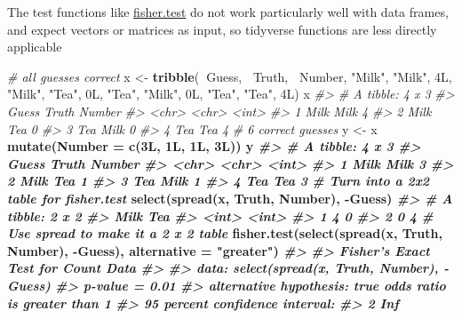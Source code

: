 \documentclass[]{book}
\newenvironment{Shaded}{\begin{snugshade}}{\end{snugshade}}
\newcommand{\KeywordTok}[1]{\textcolor[rgb]{0.13,0.29,0.53}{\textbf{#1}}}
\newcommand{\DataTypeTok}[1]{\textcolor[rgb]{0.13,0.29,0.53}{#1}}
\newcommand{\StringTok}[1]{\textcolor[rgb]{0.31,0.60,0.02}{#1}}
\newcommand{\CommentTok}[1]{\textcolor[rgb]{0.56,0.35,0.01}{\textit{#1}}}
\newcommand{\OperatorTok}[1]{\textcolor[rgb]{0.81,0.36,0.00}{\textbf{#1}}}
\newcommand{\NormalTok}[1]{#1}
\theoremstyle{definition}
\theoremstyle{definition}
\theoremstyle{definition}
\theoremstyle{remark}
\begin{document}
The test functions like
\href{https://www.rdocumentation.org/packages/stat/topics/fisher.test}{fisher.test}
do not work particularly well with data frames, and expect vectors or
matrices as input, so tidyverse functions are less directly applicable

\begin{Shaded}
\begin{Highlighting}[]
\CommentTok{# all guesses correct}
\NormalTok{x <-}\StringTok{ }\KeywordTok{tribble}\NormalTok{(}\OperatorTok{~}\NormalTok{Guess, }\OperatorTok{~}\NormalTok{Truth, }\OperatorTok{~}\NormalTok{Number,}
             \StringTok{"Milk"}\NormalTok{, }\StringTok{"Milk"}\NormalTok{, 4L,}
             \StringTok{"Milk"}\NormalTok{, }\StringTok{"Tea"}\NormalTok{, 0L,}
             \StringTok{"Tea"}\NormalTok{, }\StringTok{"Milk"}\NormalTok{, 0L,}
             \StringTok{"Tea"}\NormalTok{, }\StringTok{"Tea"}\NormalTok{, 4L)}
\NormalTok{x}
\CommentTok{#> # A tibble: 4 x 3}
\CommentTok{#>   Guess Truth Number}
\CommentTok{#>   <chr> <chr>  <int>}
\CommentTok{#> 1 Milk  Milk       4}
\CommentTok{#> 2 Milk  Tea        0}
\CommentTok{#> 3 Tea   Milk       0}
\CommentTok{#> 4 Tea   Tea        4}
\CommentTok{# 6 correct guesses}
\NormalTok{y <-}\StringTok{ }\NormalTok{x }\OperatorTok{%>%}
\StringTok{  }\KeywordTok{mutate}\NormalTok{(}\DataTypeTok{Number =} \KeywordTok{c}\NormalTok{(3L, 1L, 1L, 3L))}
\NormalTok{y}
\CommentTok{#> # A tibble: 4 x 3}
\CommentTok{#>   Guess Truth Number}
\CommentTok{#>   <chr> <chr>  <int>}
\CommentTok{#> 1 Milk  Milk       3}
\CommentTok{#> 2 Milk  Tea        1}
\CommentTok{#> 3 Tea   Milk       1}
\CommentTok{#> 4 Tea   Tea        3}
\CommentTok{# Turn into a 2x2 table for fisher.test}
\KeywordTok{select}\NormalTok{(}\KeywordTok{spread}\NormalTok{(x, Truth, Number), }\OperatorTok{-}\NormalTok{Guess)}
\CommentTok{#> # A tibble: 2 x 2}
\CommentTok{#>    Milk   Tea}
\CommentTok{#>   <int> <int>}
\CommentTok{#> 1     4     0}
\CommentTok{#> 2     0     4}
\CommentTok{# Use spread to make it a 2 x 2 table}
\KeywordTok{fisher.test}\NormalTok{(}\KeywordTok{select}\NormalTok{(}\KeywordTok{spread}\NormalTok{(x, Truth, Number), }\OperatorTok{-}\NormalTok{Guess),}
            \DataTypeTok{alternative =} \StringTok{"greater"}\NormalTok{)}
\CommentTok{#> }
\CommentTok{#>  Fisher's Exact Test for Count Data}
\CommentTok{#> }
\CommentTok{#> data:  select(spread(x, Truth, Number), -Guess)}
\CommentTok{#> p-value = 0.01}
\CommentTok{#> alternative hypothesis: true odds ratio is greater than 1}
\CommentTok{#> 95 percent confidence interval:}
\CommentTok{#>    2 Inf}
}
\end{Highlighting}
\end{Shaded}
\end{document}
